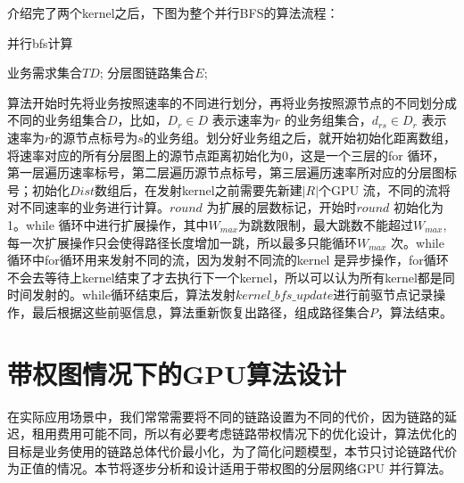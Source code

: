 介绍完了两个kernel之后，下图为整个并行BFS的算法流程：
\begin{algorithm}[t]
\begin{algorithmic}[1]
\caption{{并行bfs计算}}
\label{ParaSPC}
\Require
	 业务需求集合$TD$;
      分层图链路集合$E$;
\Else
{}
\EndIf
{}
\EndFor
\EndFor
\EndFor
\EndFor
{}
\EndFor
{}
\EndWhile
{}
\EndFor
{}
\end{algorithmic}
\end{algorithm}
 算法开始时先将业务按照速率的不同进行划分，再将业务按照源节点的不同划分成不同的业务组集合$D$，比如，$D_r \in D$ 表示速率为$r$ 的业务组集合，$d_{rs} \in D_r$ 表示速率为$r$的源节点标号为$s$的业务组。划分好业务组之后，就开始初始化距离数组，将速率对应的所有分层图上的源节点距离初始化为0，这是一个三层的for 循环，第一层遍历速率标号，第二层遍历源节点标号，第三层遍历速率所对应的分层图标号；初始化$Dist$数组后，在发射kernel之前需要先新建$|R|$个GPU 流，不同的流将对不同速率的业务进行计算。$round$ 为扩展的层数标记，开始时$round$ 初始化为1。while 循环中进行扩展操作，其中$W_{max}$为跳数限制，最大跳数不能超过$W_{max}$,每一次扩展操作只会使得路径长度增加一跳，所以最多只能循环$W_{max}$ 次。while 循环中for循环用来发射不同的流，因为发射不同流的kernel 是异步操作，for循环不会去等待上kernel结束了才去执行下一个kernel，所以可以认为所有kernel都是同时间发射的。while循环结束后，算法发射$kernel\_bfs\_update$进行前驱节点记录操作，最后根据这些前驱信息，算法重新恢复出路径，组成路径集合$P$，算法结束。
\section{带权图情况下的GPU算法设计}

在实际应用场景中，我们常常需要将不同的链路设置为不同的代价，因为链路的延迟，租用费用可能不同，所以有必要考虑链路带权情况下的优化设计，算法优化的目标是业务使用的链路总体代价最小化，为了简化问题模型，本节只讨论链路代价为正值的情况。本节将逐步分析和设计适用于带权图的分层网络GPU 并行算法。
